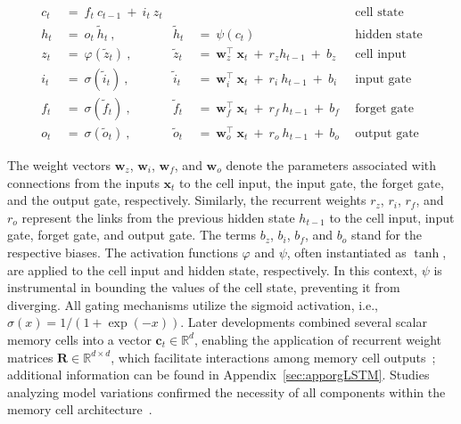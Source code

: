 \begin{align}
c_t \ &= \  f_t \ c_{t-1} \ + \ i_t \ z_t &  & &\text{cell state} \\
h_t  \ &= \ o_t \ \tilde{h}_t \ , & \tilde{h}_t \ &= \ \psi \left( c_t\right)
  &\text{hidden state} \\
z_t \ &= \ \varphi \left( \tilde{z}_t \right) \ , 
  &\tilde{z}_t \ &=  \ \mathbf{w}^\top_{z} \ \mathbf{x}_t \ + \
  r_{z}  h_{t-1} \ + \  b_{z} \ \
  &\text{cell input} \\
i_t \ &= \ \sigma \left( \tilde{i}_t  \right) \ , 
  &\tilde{i}_t \ &= \ \mathbf{w}^\top_{i} \ \mathbf{x}_t \ + \
  r_{i}  \ h_{t-1} \ + \  b_{i} \ \
  &\text{input gate} \\
f_t \ &= \ \sigma \left(  \tilde{f}_t \right) \ , 
  &\tilde{f}_t \ &= \ \mathbf{w}^\top_{f} \ \mathbf{x}_t  \ + \
  r_{f}  \ h_{t-1} \ + \  b_{f} \ \
  &\text{forget gate} \\
o_t \ &= \ \sigma \left( \tilde{o}_t \right) \ , 
  &\tilde{o}_t  \ &= \ \mathbf{w}^\top_{o} \ \mathbf{x}_t \ + \
  r_{o}  \ h_{t-1} \ + \  b_{o} \ \
  &\text{output gate} 
\end{align}

The weight vectors $\mathbf{w}_{z}$, $\mathbf{w}_{i}$, $\mathbf{w}_{f}$, and $\mathbf{w}_{o}$ denote the parameters associated with connections from the inputs $\mathbf{x}_t$ to the cell input, the input gate, the forget gate, and the output gate, respectively. Similarly, the recurrent weights $r_{z}$, $r_{i}$, $r_{f}$, and $r_{o}$ represent the links from the previous hidden state $h_{t-1}$ to the cell input, input gate, forget gate, and output gate. The terms $b_{z}$, $b_{i}$, $b_{f}$, and $b_{o}$ stand for the respective biases. The activation functions $\varphi$ and $\psi$, often instantiated as $\tanh$, are applied to the cell input and hidden state, respectively. In this context, $\psi$ is instrumental in bounding the values of the cell state, preventing it from diverging. All gating mechanisms utilize the sigmoid activation, i.e., $\sigma \left( x \right)= 1/(1+\exp(-x))$. Later developments combined several scalar memory cells into a vector $\mathbf{c}_t \in \mathbb{R}^{d}$, enabling the application of recurrent weight matrices $\mathbf{R} \in \mathbb{R}^{d \times d}$, which facilitate interactions among memory cell outputs~\citep{Greff:15}; additional information can be found in Appendix~\ref{sec:apporgLSTM}. Studies analyzing model variations confirmed the necessity of all components within the memory cell architecture~\citep{Greff:15}.

